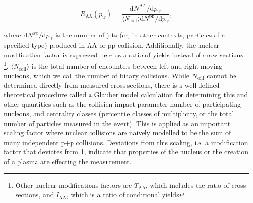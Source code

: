   \begin{equation}
    R_\mathrm{AA}(p_\mathrm{T}) = \frac{\mathrm{d}N^\mathrm{AA}/\mathrm{d}p_\mathrm{T}}{\langle N_\mathrm{coll}\rangle\mathrm{d}N^\mathrm{pp}/\mathrm{d}p_\mathrm{T}},
    \label{eq:raa}
  \end{equation}

  where $\mathrm{d}N^{xx}/\mathrm{d}p_\mathrm{T}$ is the number of jets (or, in other contexts, particles of a specified type) produced in AA or pp collision. Additionally, the nuclear modification factor is expressed here as a ratio of yields instead of cross sections \footnote{Other nuclear modifications factors are $T_\mathrm{AA}$, which includes the ratio of cross sections, and $I_\mathrm{AA}$, which is a ratio of conditional yields}. $\langle N_\mathrm{coll}\rangle$ is the total number of encounters between left and right moving nucleons, which we call the number of binary collisions. While $N_\mathrm{coll}$ cannot be determined directly from measured cross sections, there is a well-defined theoretical procedure called a Glauber model calculation \cite{doi:10.1146/annurev.nucl.57.090506.123020} for determining this and other quantities such as the collision impact parameter number of participating nucleons, and centrality classes (percentile classes of multiplicity, or the total number of particles measured in the event). This is applied as an important scaling factor where nuclear collisions are naively modelled to be the sum of many independent p+p collisions. Deviations from this scaling, i.e. a modification factor that deviates from 1, indicate that properties of the nucleus or the creation of a plasma are effecting the measurement.

